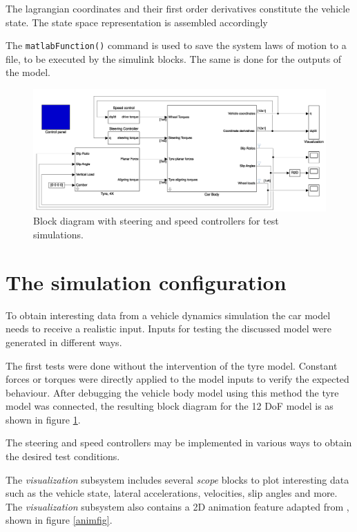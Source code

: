 The lagrangian coordinates and their first order derivatives constitute the vehicle state. The state space representation is assembled accordingly

The \texttt{matlabFunction()} command is used to save the system laws of motion to a file, to be executed by the simulink blocks. The same is done for the outputs of the model.

\begin{figure}
    \centering
    \includegraphics[width=\textwidth]{images/12doftest.png}
    \caption{Block diagram with steering and speed controllers for test simulations.}
    \label{12doftest}
\end{figure}

\section{The simulation configuration}
To obtain interesting data from a vehicle dynamics simulation the car model needs to receive a realistic input. Inputs for testing the discussed model were generated in different ways.

The first tests were done without the intervention of the tyre model. Constant forces or torques were directly applied to the model inputs to verify the expected behaviour.
After debugging the vehicle body model using this method the tyre model was connected, the resulting block diagram for the 12 DoF model is as shown in figure \ref{12doftest}.

The steering and speed controllers may be implemented in various ways to obtain the desired test conditions.

The \textit{visualization} subsystem includes several \textit{scope} blocks to plot interesting data such as the vehicle state, lateral accelerations, velocities, slip angles and more. The \textit{visualization} subsystem also contains a 2D animation feature adapted from \cite{animation}, shown in figure \ref{animfig}.

